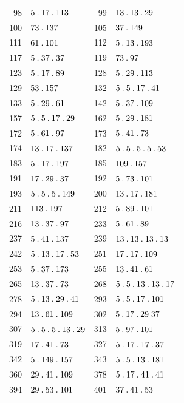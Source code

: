 \begin{longtable}{@{}r|l@{\qquad}r|l@{}}
98 & $5\mathbin{.} 17\mathbin{.} 113$ & 99 & $13\mathbin{.} 13\mathbin{.} 29$\\
100 & $73\mathbin{.} 137$ & 105 & $37\mathbin{.} 149$\\
111 & $61\mathbin{.} 101$ & 112 & $5\mathbin{.} 13\mathbin{.} 193$\\
117 & $5\mathbin{.} 37\mathbin{.} 37$ & 119 & $73\mathbin{.} 97$\\
123 & $5\mathbin{.} 17\mathbin{.} 89$ & 128 & $5\mathbin{.} 29\mathbin{.} 113$\\
129 & $53\mathbin{.} 157$ & 132 & $5\mathbin{.} 5\mathbin{.} 17\mathbin{.} 41$\\
133 & $5\mathbin{.} 29\mathbin{.} 61$ & 142 & $5\mathbin{.} 37\mathbin{.} 109$\\
157 & $5\mathbin{.} 5\mathbin{.} 17\mathbin{.} 29$ & 162 & $5\mathbin{.} 29\mathbin{.} 181$\\
172 & $5\mathbin{.} 61\mathbin{.} 97$ & 173 & $5\mathbin{.} 41\mathbin{.} 73$\\
174 & $13\mathbin{.} 17\mathbin{.} 137$ & 182 & $5\mathbin{.} 5\mathbin{.} 5\mathbin{.} 5\mathbin{.} 53$\\
183 & $5\mathbin{.} 17\mathbin{.} 197$ & 185 & $109\mathbin{.} 157$\\
191 & $17\mathbin{.} 29\mathbin{.} 37$ & 192 & $5\mathbin{.} 73\mathbin{.} 101$\\
193 & $5\mathbin{.} 5\mathbin{.} 5\mathbin{.} 149$ & 200 & $13\mathbin{.} 17\mathbin{.} 181$\\
211 & $113\mathbin{.} 197$ & 212 & $5\mathbin{.} 89\mathbin{.} 101$\\
216 & $13\mathbin{.} 37\mathbin{.} 97$ & 233 & $5\mathbin{.} 61\mathbin{.} 89$\\
237 & $5\mathbin{.} 41\mathbin{.} 137$ & 239 & $13\mathbin{.} 13\mathbin{.} 13\mathbin{.} 13$\\
242 & $5\mathbin{.} 13\mathbin{.} 17\mathbin{.} 53$ & 251 & $17\mathbin{.} 17\mathbin{.} 109$\\
253 & $5\mathbin{.} 37\mathbin{.} 173$ & 255 & $13\mathbin{.} 41\mathbin{.} 61$\\
265 & $13\mathbin{.} 37\mathbin{.} 73$ & 268 & $5\mathbin{.} 5\mathbin{.} 13\mathbin{.} 13\mathbin{.} 17$\\
278 & $5\mathbin{.} 13\mathbin{.} 29\mathbin{.} 41$ & 293 & $5\mathbin{.} 5\mathbin{.} 17\mathbin{.} 101$\\
294 & $13\mathbin{.} 61\mathbin{.} 109$ & 302 & $5\mathbin{.} 17\mathbin{.} 29\;37$\\
307 & $5\mathbin{.} 5\mathbin{.} 5\mathbin{.} 13\mathbin{.} 29$ & 313 & $5\mathbin{.} 97\mathbin{.} 101$\\
319 & $17\mathbin{.} 41\mathbin{.} 73$ & 327 & $5\mathbin{.} 17\mathbin{.} 17\mathbin{.} 37$\\
342 & $5\mathbin{.} 149\mathbin{.} 157$ & 343 & $5\mathbin{.} 5\mathbin{.} 13\mathbin{.} 181$\\
360 & $29\mathbin{.} 41\mathbin{.} 109$ & 378 & $5\mathbin{.} 17\mathbin{.} 41\mathbin{.} 41$\\
394 & $29\mathbin{.} 53\mathbin{.} 101$ & 401 & $37\mathbin{.} 41\mathbin{.} 53$\\

\end{longtable}
